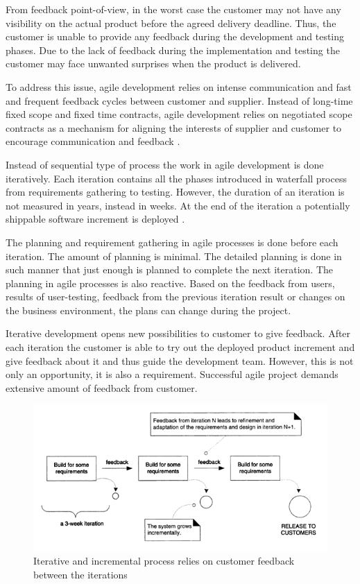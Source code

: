 \documentclass[english,12pt,a4paper,pdftex]{article}
\begin{document}
From feedback point-of-view, in the worst case the customer may not have any visibility on the actual product before the agreed delivery deadline. Thus, the customer is unable to provide any feedback during the development and testing phases. Due to the lack of feedback during the implementation and testing the customer may face unwanted surprises when the product is delivered.

To address this issue, agile development relies on intense communication and fast and frequent feedback cycles between customer and supplier. Instead of long-time fixed scope and fixed time contracts, agile development relies on negotiated scope contracts as a mechanism for aligning the interests of supplier and customer to encourage communication and feedback \citep{beck2004}.

Instead of sequential type of process the work in agile development is done iteratively. Each iteration contains all the phases introduced in waterfall process from requirements gathering to testing. However, the duration of an iteration is not measured in years, instead in weeks. At the end of the iteration a potentially shippable software increment is deployed \citep{shore2007}.

The planning and requirement gathering in agile processes is done before each iteration. The amount of planning is minimal. The detailed planning is done in such manner that just enough is planned to complete the next iteration. The planning in agile processes is also reactive. Based on the feedback from users, results of user-testing, feedback from the previous iteration result or changes on the business environment, the plans can change during the project. 

Iterative development opens new possibilities to customer to give feedback. After each iteration the customer is able to try out the deployed product increment and give feedback about it and thus guide the development team. However, this is not only an opportunity, it is also a requirement. Successful agile project demands extensive amount of feedback from customer.

\begin{figure}[htb]
\begin{center}
\includegraphics[width=1.0\textwidth]{iterative_and_incremental.png}
\end{center}
\caption{Iterative and incremental process relies on customer feedback between the iterations \citep{larman2004}}
\label{fig:iterative_and_incremental}
\end{figure}
\end{document}
